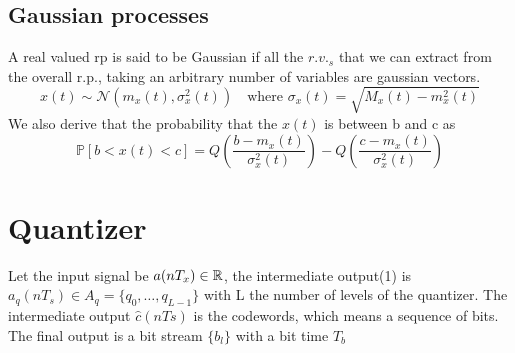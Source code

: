 \subsection{Gaussian processes}
A real valued rp is said to be Gaussian if all the $r.v._s$ that we can extract from the overall r.p., taking an arbitrary number of variables are gaussian vectors.
\begin{equation}
  x(t)\sim \mathcal{N} (m_x(t),\sigma^2_x(t)) \quad \text{where } \sigma_x(t) =  \sqrt{M_x(t)-m_x^2(t)}
\end{equation}
We also derive that the probability that the $x(t)$ is between b and c as
\begin{equation}
  \mathbb{P}[b<x(t)<c] = Q\left(\frac{b-m_x(t)}{\sigma_x^2(t)}\right)-Q\left(\frac{c-m_x(t)}{\sigma_x^2(t)}\right)
\end{equation}

%   
\section{Quantizer}
Let the input signal be $a(n T_x) \in \mathbb{R}$, the intermediate output(1) is $a_q(nT_s) \in A_q = \lbrace q_0,\dots,q_{L-1} \rbrace$ with L the number of levels of the quantizer.
The intermediate output $\hat{c}(n Ts)$ is the codewords, which means a sequence of bits. The final output is a bit stream $\lbrace b_l \rbrace$ with a bit time $T_b$

